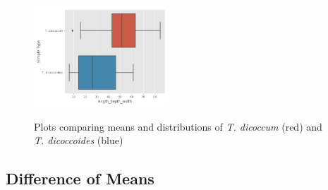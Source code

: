 \documentclass[11pt]{report}
\begin{document}
\begin{figure}[!ht]
{    \includegraphics[width=0.45\textwidth]{./images/results/group2/length_depth_width.png}
    }
  \caption{Plots comparing means and distributions of \textit{T. dicoccum} (red) and \textit{T. dicoccoides} (blue)}
  \label{fig:dummy}
\end{figure}
\clearpage
\subsection{Difference of Means}
\label{sec:org141bd94}
\end{document}
